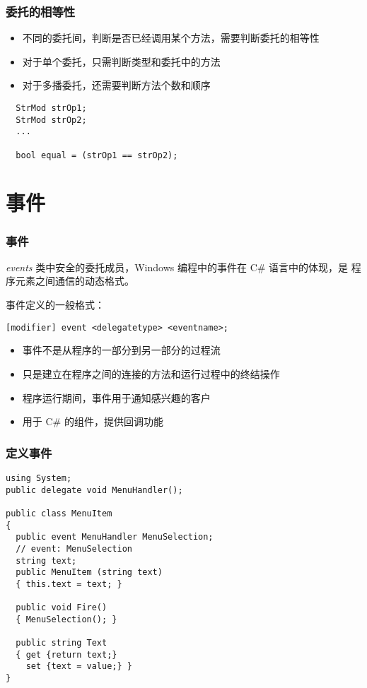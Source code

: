 \begin{frame}[fragile]
\frametitle{委托的相等性}
\begin{itemize}
\item 不同的委托间，判断是否已经调用某个方法，需要判断委托的相等性
\item 对于单个委托，只需判断类型和委托中的方法
\item 对于多播委托，还需要判断方法个数和顺序
\end{itemize}
\begin{lstlisting}
  StrMod strOp1;
  StrMod strOp2;
  ...

  bool equal = (strOp1 == strOp2);

\end{lstlisting}
\end{frame}



\section{事件}

\begin{frame}[fragile]
\frametitle{事件}
\begin{block}{\textit{events}}
  \CJKindent 类中安全的委托成员，Windows 编程中的事件在 C\# 语言中的体现，是
  程序元素之间通信的动态格式。
\end{block}
事件定义的一般格式：
\begin{lstlisting}
[modifier] event <delegatetype> <eventname>;
\end{lstlisting}
\pause
\begin{itemize}
\item 事件不是从程序的一部分到另一部分的过程流
\item 只是建立在程序之间的连接的方法和运行过程中的终结操作
\item 程序运行期间，事件用于通知感兴趣的客户
\item 用于 C\# 的组件，提供回调功能
\end{itemize}
\end{frame}

\begin{frame}[fragile]
\frametitle{定义事件}
\begin{lstlisting}
using System;
public delegate void MenuHandler();

public class MenuItem
{
  public event MenuHandler MenuSelection;
  // event: MenuSelection
  string text;
  public MenuItem (string text)
  { this.text = text; }

  public void Fire()
  { MenuSelection(); }

  public string Text
  { get {return text;}
    set {text = value;} }
}
\end{lstlisting}

\end{frame}

